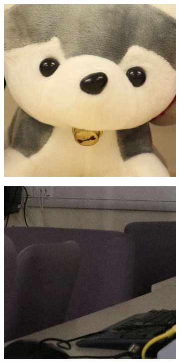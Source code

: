 \begin{figure}
\begin{subfigure}[t]{0.19\textwidth}
    \end{subfigure}
    \hfill
    \begin{subfigure}[t]{0.19\textwidth}
        \centering
        \includegraphics[width=1\textwidth]{images/dataset/Canon5D2_5_200_3200_toy_3_real.JPG}
    \end{subfigure}
    \hfill
    \begin{subfigure}[t]{0.19\textwidth}
        \centering
        \includegraphics[width=1\textwidth]{images/dataset/Canon80D_8_8_6400_comproom_11_real.JPG}

\end{subfigure}
\end{figure}
